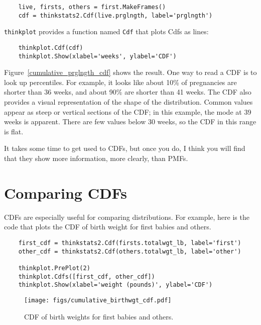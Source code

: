 \documentclass[12pt]{book}
\begin{document}
\begin{verbatim}
    live, firsts, others = first.MakeFrames()
    cdf = thinkstats2.Cdf(live.prglngth, label='prglngth')
\end{verbatim}

{\tt thinkplot} provides a function named {\tt Cdf} that
plots Cdfs as lines:

\begin{verbatim}
    thinkplot.Cdf(cdf)
    thinkplot.Show(xlabel='weeks', ylabel='CDF')
\end{verbatim}

Figure~\ref{cumulative_prglngth_cdf} shows the result.  One way to
read a CDF is to look up percentiles.  For example, it looks like
about 10\% of pregnancies are shorter than 36 weeks, and about 90\%
are shorter than 41 weeks.  The CDF also provides a visual
representation of the shape of the distribution.  Common values appear
as steep or vertical sections of the CDF; in this example, the mode at
39 weeks is apparent.  There are few values below 30 weeks, so
the CDF in this range is flat.

It takes some time to get used to CDFs, but once you
do, I think you will find that they show more information, more
clearly, than PMFs.


\section{Comparing CDFs}
\label{birth_weights}

CDFs are especially useful for comparing distributions.  For
example, here is the code that plots the CDF of birth
weight for first babies and others.

\begin{verbatim}
    first_cdf = thinkstats2.Cdf(firsts.totalwgt_lb, label='first')
    other_cdf = thinkstats2.Cdf(others.totalwgt_lb, label='other')

    thinkplot.PrePlot(2)
    thinkplot.Cdfs([first_cdf, other_cdf])
    thinkplot.Show(xlabel='weight (pounds)', ylabel='CDF')
\end{verbatim}

\begin{figure}
\centerline{\texttt{[image: figs/cumulative\_birthwgt\_cdf.pdf]}}
\caption{CDF of birth weights for first babies and others.}
\label{cumulative_birthwgt_cdf}
\end{figure}
\end{document}
